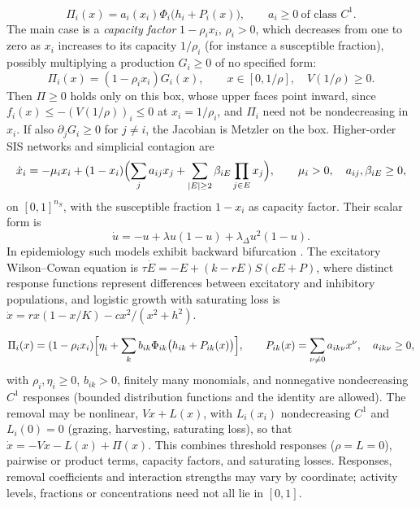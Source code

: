 \begin{equation}\label{eq:KB-general-response}
 \Pi_i(x)=a_i(x_i)\Phi_i\bigl(h_i+P_i(x)\bigr),\qquad a_i\ge0\ \text{of class }C^1.
\end{equation}
The main case is a \emph{capacity factor} $1-\rho_ix_i$, $\rho_i>0$, which decreases from one to zero as $x_i$ increases to its
capacity $1/\rho_i$ (for instance a susceptible fraction), possibly multiplying a production $G_i\ge0$ of no specified form:
\begin{equation}\label{eq:KB-capacity}
 \Pi_i(x)=(1-\rho_ix_i)G_i(x),\qquad x\in[0,1/\rho],\quad V(1/\rho)\ge0.
\end{equation}
Then $\Pi\ge0$ holds only on this box, whose upper faces point inward, since $f_i(x)\le-(V(1/\rho))_i\le0$ at $x_i=1/\rho_i$, and
$\Pi_i$ need not be nondecreasing in $x_i$. If also $\partial_jG_i\ge0$ for $j\ne i$, the Jacobian is Metzler on the box.
Higher-order SIS networks and simplicial contagion \cite{IPB} are
\begin{equation}\label{eq:SIS}
 \dot x_i=-\mu_ix_i+(1-x_i)
 \Bigl(\sum_ja_{ij}x_j+\sum_{|E|\ge2}\beta_{iE}\prod_{j\in E}x_j\Bigr),
 \qquad \mu_i>0,\quad a_{ij},\beta_{iE}\ge0,
\end{equation}
on $[0,1]^{n_S}$, with the susceptible fraction $1-x_i$ as capacity factor. Their scalar form is
\begin{equation}\label{eq:simp}
 \dot u=-u+\lambda u(1-u)+\lambda_\Delta u^2(1-u).
\end{equation}
In epidemiology such models exhibit backward bifurcation \cite{ArinoMc}. The excitatory Wilson--Cowan equation
\cite{WilsonCowan1972} is $\tau\dot E=-E+(k-rE)S(cE+P)$, where distinct response functions represent differences between
excitatory and inhibitory populations, and logistic growth with saturating loss is $\dot x=rx(1-x/K)-cx^2/(x^2+h^2)$.

\begin{equation}\label{eq:intro-family}
 \Pi_i(x)=(1-\rho_ix_i)\Bigl[\eta_i+\sum_{k}b_{ik}\Phi_{ik}\bigl(h_{ik}+P_{ik}(x)\bigr)\Bigr],
 \qquad P_{ik}(x)=\sum_{\nu\ne0}a_{ik\nu}x^\nu,\quad a_{ik\nu}\ge0,
\end{equation}
with $\rho_i,\eta_i\ge0$, $b_{ik}>0$, finitely many monomials, and nonnegative nondecreasing $C^1$ responses (bounded distribution
functions and the identity are allowed). The removal may be nonlinear, $Vx+L(x)$, with $L_i(x_i)$ nondecreasing $C^1$ and
$L_i(0)=0$ (grazing, harvesting, saturating loss), so that $\dot x=-Vx-L(x)+\Pi(x)$. This combines threshold responses
($\rho=L=0$), pairwise or product terms, capacity factors, and saturating losses. Responses, removal coefficients and
interaction strengths may vary by coordinate; activity levels, fractions or concentrations need not all lie in $[0,1]$.
\EEN

